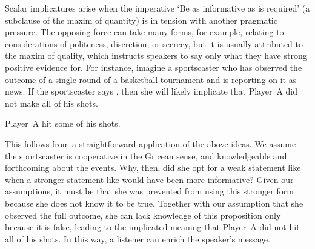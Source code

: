 \documentclass[leqno]{article}
\begin{document}
Scalar implicatures arise when the imperative `Be as informative as is
required' (a subclause of the maxim of quantity) is in tension with
another pragmatic pressure. The opposing force can take many forms,
for example, relating to considerations of politeness, discretion, or
secrecy, but it is usually attributed to the maxim of quality, which
instructs speakers to say only what they have strong positive evidence
for. For instance, imagine a sportscaster who has observed the outcome
of a single round of a basketball tournament and is reporting on it as
news. If the sportscaster says , then she will likely
implicate that Player~A did not make all of his shots.
%
\begin{examples}
\item\label{some} Player~A hit some of his shots.
\end{examples}

This follows from a straightforward application of the above ideas. We
assume the sportscaster is cooperative in the Gricean sense, and
knowledgeable and forthcoming about the events. Why, then, did she opt
for a weak statement like  when a
stronger statement like  would
have been more informative? Given our assumptions, it must be that she
was prevented from using this stronger form because she does not know
it to be true. Together with our assumption that she observed the full
outcome, she can lack knowledge of this proposition only because it is
false, leading to the implicated meaning that Player~A did not hit all
of his shots. In this way, a listener can enrich the speaker's
message.
\end{document}
